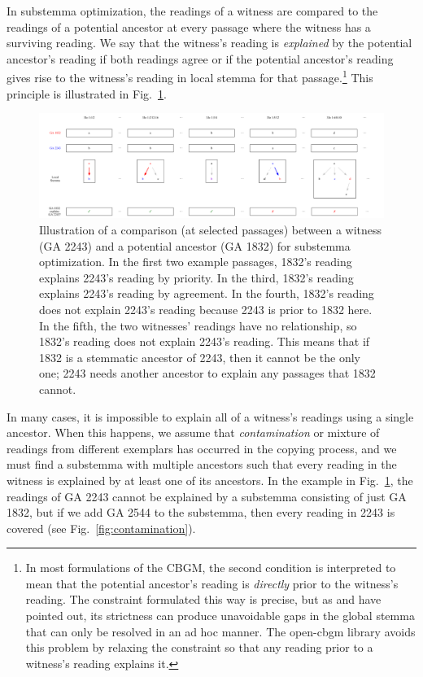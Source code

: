 \documentclass[a4paper, 12pt]{article}
\begin{document}
	In substemma optimization, the readings of a witness are compared to the readings of a potential ancestor at every passage where the witness has a surviving reading. We say that the witness's reading is \emph{explained} by the potential ancestor's reading if both readings agree or if the potential ancestor's reading gives rise to the witness's reading in local stemma for that passage.\footnote{In most formulations of the CBGM, the second condition is interpreted to mean that the potential ancestor's reading is \emph{directly} prior to the witness's reading. The constraint formulated this way is precise, but as \cite[59--63]{Mink04} and \cite[139--140]{Edmondson19} have pointed out, its strictness can produce unavoidable gaps in the global stemma that can only be resolved in an ad hoc manner. The \textsf{open-cbgm} library avoids this problem by relaxing the constraint so that any reading prior to a witness's reading explains it.} This principle is illustrated in Fig.~\ref{fig:explained-readings}.
	
	\begin{figure}[h!]
		\centering
		\includegraphics[width=\textwidth]{../graphics/explained-readings.pdf}
		\caption{Illustration of a comparison (at selected passages) between a witness (GA 2243) and a potential ancestor (GA 1832) for substemma optimization. In the first two example passages, 1832's reading explains 2243's reading by priority. In the third, 1832's reading explains 2243's reading by agreement. In the fourth, 1832's reading does not explain 2243's reading because 2243 is prior to 1832 here. In the fifth, the two witnesses' readings have no relationship, so 1832's reading does not explain 2243's reading. This means that if 1832 is a stemmatic ancestor of 2243, then it cannot be the only one; 2243 needs another ancestor to explain any passages that 1832 cannot.}
		\label{fig:explained-readings}
	\end{figure}
	
	\newpage
	
	In many cases, it is impossible to explain all of a witness's readings using a single ancestor. When this happens, we assume that \emph{contamination} or mixture of readings from different exemplars has occurred in the copying process, and we must find a substemma with multiple ancestors such that every reading in the witness is explained by at least one of its ancestors. In the example in Fig.~\ref{fig:explained-readings}, the readings of GA 2243 cannot be explained by a substemma consisting of just GA 1832, but if we add GA 2544 to the substemma, then every reading in 2243 is covered (see Fig.~\ref{fig:contamination}).
	
\end{document}
